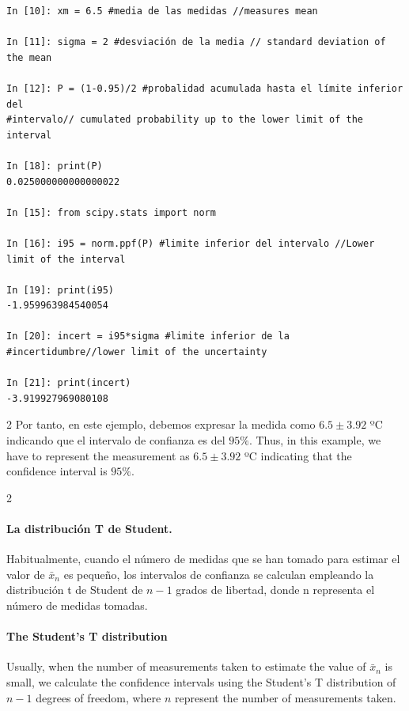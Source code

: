 \begin{verbatim}
In [10]: xm = 6.5 #media de las medidas //measures mean
			
In [11]: sigma = 2 #desviación de la media // standard deviation of the mean
			
In [12]: P = (1-0.95)/2 #probalidad acumulada hasta el límite inferior del 
#intervalo// cumulated probability up to the lower limit of the interval
			
In [18]: print(P)
0.025000000000000022
			
In [15]: from scipy.stats import norm
			
In [16]: i95 = norm.ppf(P) #limite inferior del intervalo //Lower limit of the interval
			
In [19]: print(i95)
-1.959963984540054
			
In [20]: incert = i95*sigma #limite inferior de la 
#incertidumbre//lower limit of the uncertainty 
			
In [21]: print(incert)
-3.919927969080108
\end{verbatim}

\begin{paracol}{2}
Por tanto, en este ejemplo, debemos expresar la medida como $6.5 \pm 3.92$ ºC indicando que el intervalo de confianza es del $95\%$.
\switchcolumn
Thus, in this example, we have to represent the measurement as $6.5 \pm 3.92$ ºC indicating that the confidence interval is $95\%$.
\end{paracol}

\begin{paracol}{2}
\paragraph{La distribución T de Student.} 
Habitualmente, cuando el número de medidas que se han tomado para estimar el valor de $\bar{x}_n$ es pequeño, los intervalos de confianza se calculan empleando la distribución t de Student de $n-1$ grados de libertad, donde  n representa el número de medidas tomadas.

\switchcolumn
\paragraph{The Student's T distribution}
Usually, when the number of measurements taken to estimate the value of $\bar{x}_n$ is small, we calculate the confidence intervals using the Student's T distribution of $n-1$ degrees of freedom, where $n$ represent the number of measurements taken.  
\end{paracol}

